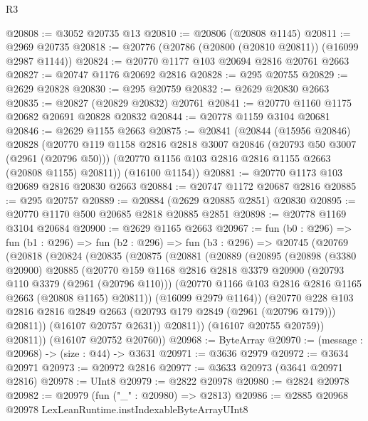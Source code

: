 \begin{lexlean}{R3}
\begin{coremodule}
@20808 := @3052 @20735 @13
@20810 := @20806 (@20808 @1145)
@20811 := @2969 @20735
@20818 := @20776 (@20786 (@20800 (@20810 @20811)) (@16099 @2987 @1144))
@20824 := @20770 @1177 @103 @20694 @2816 @20761 @2663
@20827 := @20747 @1176 @20692 @2816
@20828 := @295 @20755
@20829 := @2629 @20828
@20830 := @295 @20759
@20832 := @2629 @20830 @2663
@20835 := @20827 (@20829 @20832) @20761
@20841 := @20770 @1160 @1175 @20682 @20691 @20828 @20832
@20844 := @20778 @1159 @3104 @20681
@20846 := @2629 @1155 @2663
@20875 := @20841
    (@20844
      (@15956 @20846)
      @20828
      (@20770
        @119
        @1158
        @2816
        @2818
        @3007
        @20846
        (@20793 @50 @3007 (@2961 (@20796 @50)))
        (@20770 @1156 @103 @2816 @2816 @1155 @2663 (@20808 @1155) @20811))
      (@16100 @1154))
@20881 := @20770 @1173 @103 @20689 @2816 @20830 @2663
@20884 := @20747 @1172 @20687 @2816
@20885 := @295 @20757
@20889 := @20884 (@2629 @20885 @2851) @20830
@20895 := @20770 @1170 @500 @20685 @2818 @20885 @2851
@20898 := @20778 @1169 @3104 @20684
@20900 := @2629 @1165 @2663
@20967 := fun (b0 : @296) =>
  fun (b1 : @296) =>
  fun (b2 : @296) =>
  fun (b3 : @296) =>
  @20745
    (@20769
      (@20818
        (@20824
          (@20835
            (@20875
              (@20881
                (@20889
                  (@20895
                    (@20898
                      (@3380 @20900)
                      @20885
                      (@20770
                        @159
                        @1168
                        @2816
                        @2818
                        @3379
                        @20900
                        (@20793 @110 @3379 (@2961 (@20796 @110)))
                        (@20770 @1166 @103 @2816 @2816 @1165 @2663 (@20808 @1165) @20811))
                      (@16099 @2979 @1164))
                    (@20770
                      @228
                      @103
                      @2816
                      @2816
                      @2849
                      @2663
                      (@20793 @179 @2849 (@2961 (@20796 @179)))
                      @20811))
                  (@16107 @20757 @2631))
                @20811))
            (@16107 @20755 @20759))
          @20811))
      (@16107 @20752 @20760))
@20968 := ByteArray
@20970 := (message : @20968) -> (size : @44) -> @3631
@20971 := @3636 @2979
@20972 := @3634 @20971
@20973 := @20972 @2816
@20977 := @3633 @20973 (@3641 @20971 @2816)
@20978 := UInt8
@20979 := @2822 @20978
@20980 := @2824 @20978
@20982 := @20979 (fun ("_" : @20980) => @2813)
@20986 := @2885 @20968 @20978 LexLeanRuntime.instIndexableByteArrayUInt8

\end{coremodule}
\end{lexlean}

